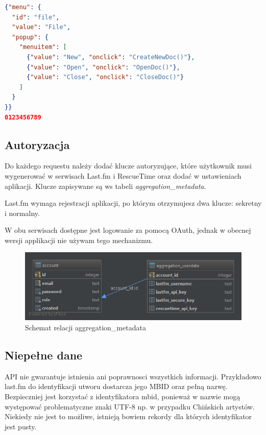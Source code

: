 \documentclass[brudnopis]{xmgr}
\begin{document}
            \begin{lstlisting}[language=json,firstnumber=1]
{"menu": {
  "id": "file",
  "value": "File",
  "popup": {
    "menuitem": [
      {"value": "New", "onclick": "CreateNewDoc()"},
      {"value": "Open", "onclick": "OpenDoc()"},
      {"value": "Close", "onclick": "CloseDoc()"}
    ]
  }
}}
0123456789
            \end{lstlisting}


        \subsection*{Autoryzacja}
        
        Do każdego requestu należy dodać klucze autoryzujące, które użytkownik musi wygenerować w serwisach Last.fm i RescueTime \cite{rescuetime:apidoc-keymanagment} oraz dodać w ustawieniach aplikacji. Klucze zapisywane są ws tabeli \textit{aggregation\_metadata}.
        
        Last.fm wymaga rejestracji aplikacji, po którym otrzymujesz dwa klucze: sekretny i normalny.
        
        W obu serwisach dostępne jest logowanie za pomocą OAuth, jednak w obecnej wersji applikacji nie używam tego mechanizmu.
        
        \begin{figure}
        	\includegraphics[width=\linewidth]{fig/db-aggregation-metadata.png}
        	\caption{Schemat relacji aggregation\_metadata}
        	\label{fig:}
        \end{figure}

        \subsection*{Niepełne dane}
        API nie gwarantuje istnienia ani poprawnosci wszystkich informacji.
        Przykładowo last.fm do identyfikacji utworu dostarcza jego MBID oraz pełną nazwę.
        Bezpieczniej jest korzystać z identyfikatora mbid, ponieważ w nazwie mogą występować problematyczne znaki UTF-8 np. w przypadku Chińskich artystów.
        Niekiedy nie jest to możliwe, istnieją bowiem rekordy dla których identyfikator jest pusty.
        
\end{document}
